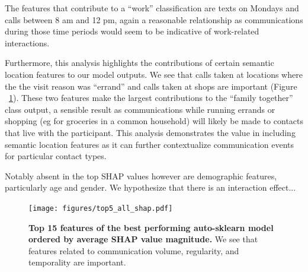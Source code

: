 \documentclass[acmlarge]{acmart}
\begin{document}
The features that contribute to a ``work'' classification are texts on Mondays and calls between 8 am and 12 pm, again a reasonable relationship as communications during those time periods would seem to be indicative of work-related interactions.

Furthermore, this analysis highlights the contributions of certain semantic location features to our model outputs. We see that calls taken at locations where the the visit reason was ``errand'' and calls taken at shops are important (Figure ~\ref{fig:top5_ag_shap}). These two features make the largest contributions to the ``family together'' class output, a sensible result as communications while running errands or shopping (eg for groceries in a common household) will likely be made to contacts that live with the participant. This analysis demonstrates the value in including semantic location features as it can further contextualize communication events for particular contact types.

Notably absent in the top SHAP values however are demographic features, particularly age and gender. We hypothesize that there is an interaction effect...

\begin{figure}[h]
    \centering
    \texttt{[image: figures/top5\_all\_shap.pdf]}
    \caption{\textbf{Top 15 features of the best performing auto-sklearn model ordered by average SHAP value magnitude.} We see that features related to communication volume, regularity, and temporality are important. }
    \label{fig:top5_ag_shap}    
\end{figure}



\end{document}
